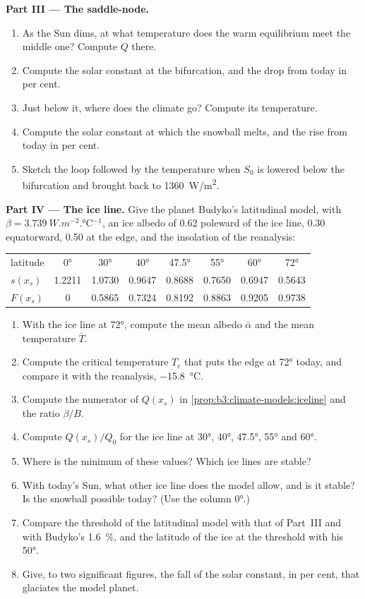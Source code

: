 \begin{problem}
\medskip\noindent\textbf{Part III --- The saddle-node.}
\begin{enumerate}[resume]
\item As the Sun dims, at what temperature does the warm equilibrium meet
  the middle one? Compute $Q$ there.
\item Compute the solar constant at the bifurcation, and the drop from
  today in per cent.
\item Just below it, where does the climate go? Compute its temperature.
\item Compute the solar constant at which the snowball melts, and the rise
  from today in per cent.
\item Sketch the loop followed by the temperature when $S_0$ is lowered
  below the bifurcation and brought back to \qty{1360}{W/m^2}.
\end{enumerate}

\medskip\noindent\textbf{Part IV --- The ice line.} Give the planet
Budyko's latitudinal model, with $\beta = \qty{3.739}{W.m^{-2}.\celsius^{-1}}$,
an ice albedo of 0.62 poleward of the ice line, 0.30 equatorward, 0.50 at
the edge, and the insolation of the reanalysis:
\begin{center}
\begin{tabular}{lccccccc}
\hline
latitude & \ang{0} & \ang{30} & \ang{40} & \ang{47.5} & \ang{55} & \ang{60} & \ang{72}\\
$s(x_s)$ & 1.2211 & 1.0730 & 0.9647 & 0.8688 & 0.7650 & 0.6947 & 0.5643\\
$F(x_s)$ & 0 & 0.5865 & 0.7324 & 0.8192 & 0.8863 & 0.9205 & 0.9738\\
\hline
\end{tabular}
\end{center}
\begin{enumerate}[resume]
\item With the ice line at \ang{72}, compute the mean albedo $\bar\alpha$
  and the mean temperature $\bar T$.
\item Compute the critical temperature $T_c$ that puts the edge at
  \ang{72} today, and compare it with the reanalysis, \qty{-15.8}{\celsius}.
\item Compute the numerator of $Q(x_s)$ in \cref{prop:b3:climate-models:iceline}
  and the ratio $\beta/B$.
\item Compute $Q(x_s)/Q_0$ for the ice line at \ang{30}, \ang{40},
  \ang{47.5}, \ang{55} and \ang{60}.
\item Where is the minimum of these values? Which ice lines are stable?
\item With today's Sun, what other ice line does the model allow, and is
  it stable? Is the snowball possible today? (Use the column \ang{0}.)
\item Compare the threshold of the latitudinal model with that of Part~III
  and with Budyko's \qty{1.6}{\percent}, and the latitude of the ice at the
  threshold with his \ang{50}.
\item Give, to two significant figures, the fall of the solar constant, in
  per cent, that glaciates the model planet.
\end{enumerate}
\end{problem}
